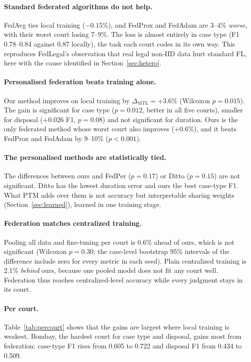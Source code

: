 \documentclass[11pt,a4paper]{article}
\newcommand{\dmtl}{\Delta_{\text{MTL}}}
\begin{document}
\paragraph{Standard federated algorithms do not help.} FedAvg ties local training ($-0.15\%$), and
FedProx and FedAdam are 3--4\% \emph{worse}, with their worst court losing 7--9\%. The loss is almost
entirely in case type (F1 0.78--0.84 against 0.87 locally), the task each court codes in its own way.
This reproduces FedLegal's observation that real legal non-IID data hurt standard FL, here with the
cause identified in Section~\ref{sec:hetero}.

\paragraph{Personalised federation beats training alone.} Our method improves on local training by
$\dmtl=+3.6\%$ (Wilcoxon $p=0.015$). The gain is significant for case type ($p=0.012$, better in all
five courts), smaller for disposal ($+0.026$ F1, $p=0.08$) and not significant for duration. Ours is
the only federated method whose worst court also improves ($+0.6\%$), and it beats FedProx and
FedAdam by 9--10\% ($p<0.001$).

\paragraph{The personalised methods are statistically tied.} The differences between ours and FedPer
($p=0.17$) or Ditto ($p=0.15$) are not significant. Ditto has the lowest duration error and ours the
best case-type F1. What PTM adds over them is not accuracy but interpretable sharing weights
(Section~\ref{sec:learned}), learned in one training stage.

\paragraph{Federation matches centralized training.} Pooling all data and fine-tuning per court is
0.6\% ahead of ours, which is not significant (Wilcoxon $p=0.30$; the case-level bootstrap 95\%
intervals of the difference include zero for every metric in each seed). Plain centralized training
is 2.1\% \emph{behind} ours, because one pooled model does not fit any court well. Federation thus
reaches centralized-level accuracy while every judgment stays in its court.

\paragraph{Per court.} Table~\ref{tab:percourt} shows that the gains are largest where local training
is weakest. Bombay, the hardest court for case type and disposal, gains most from federation: case-type
F1 rises from 0.605 to 0.722 and disposal F1 from 0.434 to 0.509.
\end{document}
